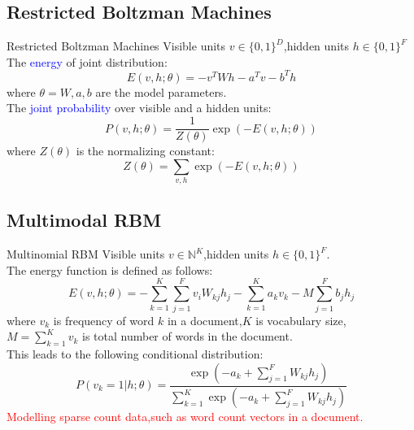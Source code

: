 \documentclass{beamer}
\begin{document}
\begin{CJK*}{UTF8}{gbsn}
\subsection{Restricted Boltzman Machines}
\begin{frame}
\begin{block}{Restricted Boltzman Machines}
Visible units $v\in\{0,1\}^D$,hidden units $h\in\{0,1\}^F$\\
The \textcolor{blue}{energy} of joint distribution:
\begin{equation}
E(v,h;\theta)=-v^TWh-a^Tv-b^Th
\end{equation}
where $\theta={W,a,b}$ are the model parameters.\\
The \textcolor{blue}{joint probability} over visible and a hidden units:
\begin{equation}
P(v,h;\theta)=\frac{1}{Z(\theta)}\exp(-E(v,h;\theta))
\end{equation}
where $Z(\theta)$ is the normalizing constant:
\begin{equation}
Z(\theta)=\sum_{v,h}\exp(-E(v,h;\theta))
\end{equation}
\end{block}
\end{frame}

\subsection{Multimodal RBM}
\begin{frame}
\begin{block}{Multinomial RBM}
Visible units $v\in \mathbb{N}^K$,hidden units $h\in\{0,1\}^F$.\\
The energy function is defined as follows:
\begin{equation}
E(v,h;\theta)=-\sum_{k=1}^K\sum_{j=1}^Fv_iW_{kj}h_j-\sum_{k=1}^Ka_kv_k-M\sum_{j=1}^Fb_jh_j
\end{equation}
where $v_k$ is frequency of word $k$ in a document,$K$ is vocabulary size,$M=\sum_{k=1}^Kv_k$ is total number of words in the document.\\
This leads to the following conditional distribution:
\begin{equation}
P(v_k=1|h;\theta)=\frac{\exp(-a_k+\sum_{j=1}^FW_{kj}h_j)}{\sum_{k=1}^K\exp(-a_k+\sum_{j=1}^FW_{kj}h_j)}
\end{equation}
\textcolor{red}{Modelling sparse count data,such as word count vectors in a document.}
\end{block}
\end{frame}


\end{CJK*}
\end{document}
